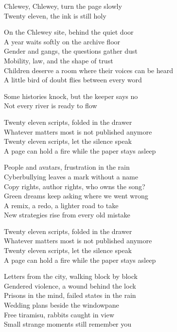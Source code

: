 \begin{lyrics}
Chlewey, Chlewey, turn the page slowly\\
Twenty eleven, the ink is still holy

On the Chlewey site, behind the quiet door\\
A year waits softly on the archive floor\\
Gender and gangs, the questions gather dust\\
Mobility, law, and the shape of trust\\
Children deserve a room where their voices can be heard\\
A little bird of doubt flies between every word

Some histories knock, but the keeper says no\\
Not every river is ready to flow

Twenty eleven scripts, folded in the drawer\\
Whatever matters most is not published anymore\\
Twenty eleven scripts, let the silence speak\\
A page can hold a fire while the paper stays asleep

People and avatars, frustration in the rain\\
Cyberbullying leaves a mark without a name\\
Copy rights, author rights, who owns the song?\\
Green dreams keep asking where we went wrong\\
A remix, a redo, a lighter road to take\\
New strategies rise from every old mistake

Twenty eleven scripts, folded in the drawer\\
Whatever matters most is not published anymore\\
Twenty eleven scripts, let the silence speak\\
A page can hold a fire while the paper stays asleep

Letters from the city, walking block by block\\
Gendered violence, a wound behind the lock\\
Prisons in the mind, failed states in the rain\\
Wedding plans beside the windowpane\\
Free tiramisu, rabbits caught in view\\
Small strange moments still remember you


\end{lyrics}
